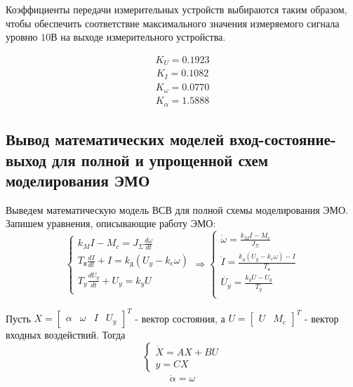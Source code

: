 \documentclass[a4paper, 11pt]{article}
\begin{document}
\par 
Коэффициенты передачи измерительных устройств выбираются таким образом, чтобы обеспечить соответствие максимального значения измеряемого сигнала уровню $10 В$ на выходе измерительного устройства.

\begin{align*}
	\displaystyle K_U = 0.1923
\end{align*}
\begin{align*}
	\displaystyle K_I = 0.1082
\end{align*}
\begin{align*}
	\displaystyle K_\omega = 0.0770
\end{align*}
\begin{align*}
	\displaystyle K_\alpha = 1.5888
\end{align*}

\newpage 
\begin{center}
	\section{Вывод математических моделей вход-состояние-выход для полной и упрощенной схем моделирования ЭМО}
\end{center}
\par 
Выведем математическую модель ВСВ для полной схемы моделирования ЭМО. Запишем уравнения, описывающие работу ЭМО:
\begin{equation}
	\displaystyle \begin{cases}
		\displaystyle k_MI-M_c = J_\Sigma\frac{d\omega}{dt}\\
		\displaystyle T_\text{я}\frac{dI}{dt}+I = k_\text{д}(U_y-k_e\omega)\\
		\displaystyle T_y\frac{dU_y}{dt}+U_y = k_yU\\
	\end{cases}
	\Rightarrow
	\begin{cases}
		\displaystyle \dot{\omega} = \displaystyle\frac{k_MI-M_c}{J_\Sigma}\\
		\displaystyle \dot{I} = \displaystyle \frac{k_\text{д}(U_y-k_e\omega)-I}{T_\text{я}}\\
		\displaystyle \dot{U_y} = \displaystyle \frac{k_yU-U_y}{T_y}\\
	\end{cases}
\end{equation}
\par 
Пусть $X = \begin{bmatrix}
	\alpha & \omega & I & U_y
\end{bmatrix}^T$ - вектор состояния, а $U = \begin{bmatrix}
	U & M_c
\end{bmatrix}^T$ - вектор входных воздействий. Тогда 
\begin{equation}
	\begin{cases}
		\dot{X} = AX+BU\\
		y = CX
	\end{cases}
\end{equation}
\begin{align}
	\dot{\alpha} = \omega
\end{align}
\end{document}
